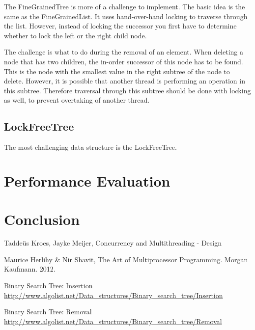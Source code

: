\documentclass[a4paper]{article}
\begin{document}
The FineGrainedTree is more of a challenge to implement. The basic idea is the same as the
FineGrainedList. It uses hand-over-hand locking to traverse through the list. However,
instead of locking the successor you first have to determine whether to lock the left or
the right child node.

The challenge is what to do during the removal of an element. When deleting a node that
has two children, the in-order successor of this node has to be found. This is the node
with the smallest value in the right subtree of the node to delete. However, it is 
possible that another thread is performing an operation in this subtree. Therefore 
traversal through this subtree should be done with locking as well, to prevent overtaking
of another thread.

\subsection{LockFreeTree}

The most challenging data structure is the LockFreeTree.

\section{Performance Evaluation}

\section{Conclusion}

\begin{thebibliography}{}    
    Taddeüs Kroes, Jayke Meijer, Concurrency and Multithreading - Design

    Maurice Herlihy \& Nir Shavit, The Art of Multiprocessor Programming. Morgan Kaufmann.         
    2012.

    Binary Search Tree: Insertion
    \url{http://www.algolist.net/Data_structures/Binary_search_tree/Insertion}
    
    Binary Search Tree: Removal
    \url{http://www.algolist.net/Data_structures/Binary_search_tree/Removal}
  
\end{thebibliography}
\end{document}
